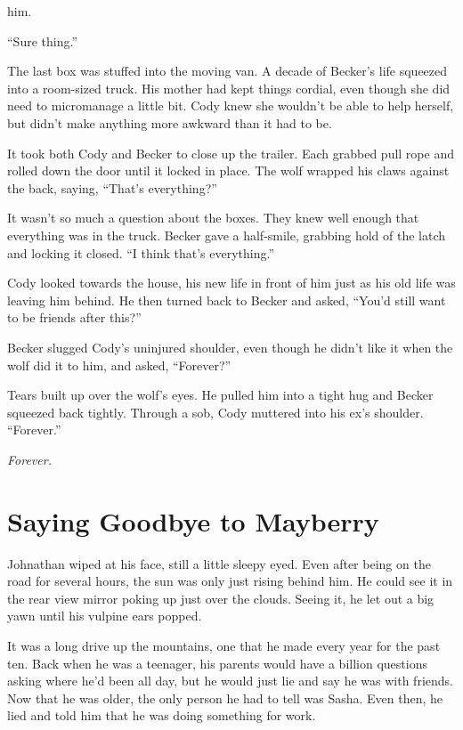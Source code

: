 him.

``Sure thing.''

The last box was stuffed into the moving van. A decade of Becker's life
squeezed into a room-sized truck. His mother had kept things cordial,
even though she did need to micromanage a little bit. Cody knew she
wouldn't be able to help herself, but didn't make anything more awkward
than it had to be.

It took both Cody and Becker to close up the trailer. Each grabbed pull
rope and rolled down the door until it locked in place. The wolf wrapped
his claws against the back, saying, ``That's everything?''

It wasn't so much a question about the boxes. They knew well enough that
everything was in the truck. Becker gave a half-smile, grabbing hold of
the latch and locking it closed. ``I think that's everything.''

Cody looked towards the house, his new life in front of him just as his
old life was leaving him behind. He then turned back to Becker and
asked, ``You'd still want to be friends after this?''

Becker slugged Cody's uninjured shoulder, even though he didn't like it
when the wolf did it to him, and asked, ``Forever?''

Tears built up over the wolf's eyes. He pulled him into a tight hug and
Becker squeezed back tightly. Through a sob, Cody muttered into his ex's
shoulder. ``Forever.''

\emph{Forever.}


\chapter*{Saying Goodbye to Mayberry}

Johnathan wiped at his face, still a little sleepy eyed. Even after
being on the road for several hours, the sun was only just rising behind
him. He could see it in the rear view mirror poking up just over the
clouds. Seeing it, he let out a big yawn until his vulpine ears popped.

It was a long drive up the mountains, one that he made every year for
the past ten. Back when he was a teenager, his parents would have a
billion questions asking where he'd been all day, but he would just lie
and say he was with friends. Now that he was older, the only person he
had to tell was Sasha. Even then, he lied and told him that he was doing
something for work.

